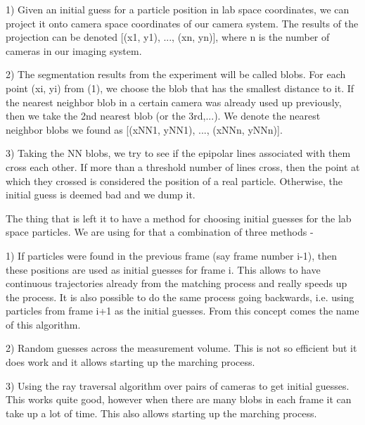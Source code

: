 \documentclass[10pt,a4paper]{article}
\begin{document}
1) Given an initial guess for a particle position in lab space coordinates, we can project it onto camera space coordinates of our camera system. The results of the projection can be denoted [(x1, y1), ..., (xn, yn)], where n is the number of cameras in our imaging system.

2) The segmentation results from the experiment will be called blobs. For each point (xi, yi) from (1), we choose the blob that has the smallest distance to it. If the nearest neighbor blob in a certain camera was already used up previously, then we take the 2nd nearest blob (or the 3rd,...). We denote the nearest neighbor blobs we found as [(xNN1, yNN1), ..., (xNNn, yNNn)]. 

3) Taking the NN blobs, we try to see if the epipolar lines associated with them cross each other. If more than a threshold number of lines cross, then the point at which they crossed is considered the position of a real particle. Otherwise, the initial guess is deemed bad and we dump it.

The thing that is left it to have a method for choosing initial guesses for the lab space particles. We are using for that a combination of three methods - 

1) If particles were found in the previous frame (say frame number i-1), then these positions are used as initial guesses for frame i. This allows to have continuous trajectories already from the matching process and really speeds up the process. It is also possible to do the same process going backwards, i.e. using particles from frame i+1 as the initial guesses. From this concept comes the name of this algorithm.

2) Random guesses across the measurement volume. This is not so efficient but it does work and it allows starting up the marching process.

3) Using the ray traversal algorithm over pairs of cameras to get initial guesses. This works quite good, however when there are many blobs in each frame it can take up a lot of time. This also allows starting up the marching process.



\end{document}
